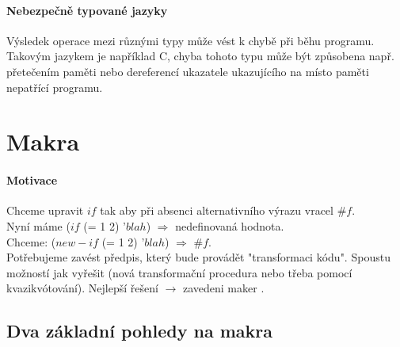\documentclass[10pt,a4paper]{article}
\begin{document}
      \paragraph{Nebezpečně typované jazyky}
        Výsledek operace mezi různými typy může vést k chybě při běhu programu. Takovým jazykem je například C, chyba tohoto typu může být způsobena např. přetečením paměti nebo dereferencí ukazatele ukazujícího na místo paměti nepatřící programu.


\newpage
\section{Makra}
\paragraph{Motivace} Chceme upravit $if$ tak aby při absenci alternativního výrazu vracel $\#f$.
\\ Nyní máme (\color{red}$if$ \color{black} (= 1 2) '$blah$) $\Rightarrow$ nedefinovaná hodnota.
\\ Chceme: (\color{red}$new-if$ \color{black} (= 1 2) '$blah$) $\Rightarrow$ $\#f$.
\\ Potřebujeme zavést předpis, který bude provádět "transformaci kódu". Spoustu možností jak vyřešit (nová transformační procedura nebo třeba pomocí kvazikvótování). Nejlepší řešení $\rightarrow$ zavedeni \color{blue} maker \color{black}.
\subsection{Dva základní pohledy na makra}
\end{document}
